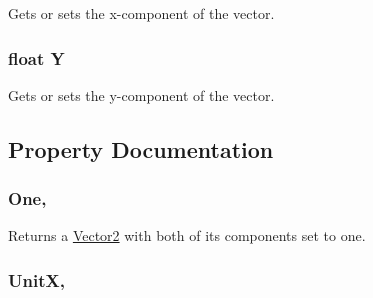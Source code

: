 Gets or sets the x-\/component of the vector.

\hypertarget{structMicrosoft_1_1Xna_1_1Framework_1_1Vector2_ac915220fb659eb2c5958a1ccd81b80d4}{}
\subsubsection[{Y}]{\setlength{\rightskip}{0pt plus 5cm}float Y}\label{structMicrosoft_1_1Xna_1_1Framework_1_1Vector2_ac915220fb659eb2c5958a1ccd81b80d4}


Gets or sets the y-\/component of the vector.



\subsection{Property Documentation}
\hypertarget{structMicrosoft_1_1Xna_1_1Framework_1_1Vector2_ad194eb1e3de0fc1ccc8972c2757fa43e}{}
\subsubsection[{One}]{ One\hspace{0.3cm}{\ttfamily [static]}, {\ttfamily [get]}}\label{structMicrosoft_1_1Xna_1_1Framework_1_1Vector2_ad194eb1e3de0fc1ccc8972c2757fa43e}


Returns a \hyperlink{structMicrosoft_1_1Xna_1_1Framework_1_1Vector2}{Vector2} with both of its components set to one.

\hypertarget{structMicrosoft_1_1Xna_1_1Framework_1_1Vector2_af7076baac701aaeafa0705f59d924b22}{}
\subsubsection[{Unit\+X}]{ Unit\+X\hspace{0.3cm}{\ttfamily [static]}, {\ttfamily [get]}}\label{structMicrosoft_1_1Xna_1_1Framework_1_1Vector2_af7076baac701aaeafa0705f59d924b22}


